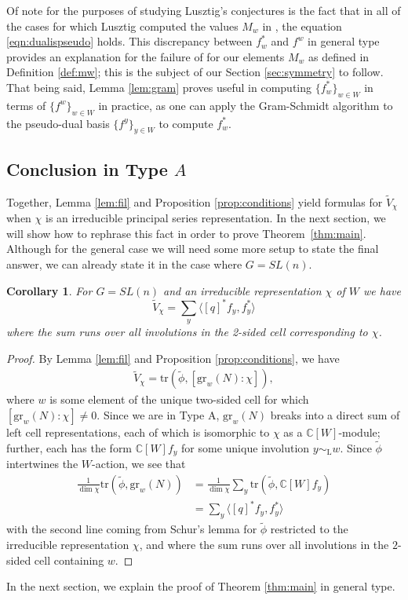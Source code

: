 \documentclass{amsart}
\newtheorem{corollary}[thm]{Corollary}
\theoremstyle{definition}
\begin{document}
Of note for the purposes of studying Lusztig's conjectures is the fact that in all of the cases for which Lusztig computed the values $M_w$ in \cite{L}, the equation \eqref{eqn:dualispseudo} holds. This discrepancy between $f_w^*$ and $f^w$ in general type provides an explanation for the failure of \cite[Conjecture 2.3ii)]{L} for our elements $M_w$ as defined in Definition \ref{def:mw}; this is the subject of our Section \ref{sec:symmetry} to follow. That being said, Lemma \ref{lem:gram} proves useful in computing $\{f_w^*\}_{w \in W}$ in terms of $\{f^w\}_{w \in W}$ in practice, as one can apply the Gram-Schmidt algorithm to the pseudo-dual basis $\{f^y\}_{y \in W}$ to compute $f_w^*$. 

\subsection{Conclusion in Type $A$}

Together, Lemma \ref{lem:fil} and Proposition \ref{prop:conditions} yield formulas for $\tilde{V}_\chi$ when $\chi$ is an irreducible principal series representation. In the next section, we will show how to rephrase this fact in order to prove Theorem~\ref{thm:main}. Although for the general case we will need some more setup to state the final answer, we can already state it in the case where $G = SL(n)$.
\begin{corollary}
For $G=SL(n)$ and an irreducible representation $\chi$ of $W$ we have
$$\tilde V_\chi=\sum_y \langle [q]^*f_y,f_y^*\rangle$$
where the sum runs over all involutions in the 2-sided cell corresponding to $\chi$.
\end{corollary}
\begin{proof}
By Lemma \ref{lem:fil} and Proposition \ref{prop:conditions}, we have
\begin{align}
    \tilde{V}_\chi = \mathrm{tr}(\tilde{\phi}, [\mathrm{gr}_w(N) : \chi]),
\end{align}
where $w$ is some element of the unique two-sided cell for which $[\mathrm{gr}_w(N) : \chi] \neq 0$. Since we are in Type A, $\mathrm{gr}_w(N)$ breaks into a direct sum of left cell representations, each of which is isomorphic to $\chi$ as a $\mathbb{C}[W]$-module; further, each has the form $\mathbb{C}[W]f_y$ for some unique involution $y \sim_\mathrm{L} w$. Since $\tilde{\phi}$ intertwines the $W$-action, we see that
\begin{align}
    \frac{1}{\dim \chi}\mathrm{tr}(\tilde{\phi}, \mathrm{gr}_w(N)) & = \frac{1}{\dim \chi}\sum_y \mathrm{tr}(\tilde{\phi}, \mathbb{C}[W]f_y)\\
    & = \sum_y \langle [q]^*f_y, f_y^*\rangle
\end{align}
with the second line coming from Schur's lemma for $\tilde\phi$ restricted to the irreducible representation $\chi$, and where the sum runs over all involutions in the $2$-sided cell containing $w$.
\end{proof}
In the next section, we explain the proof of Theorem \ref{thm:main} in general type.
\end{document}
